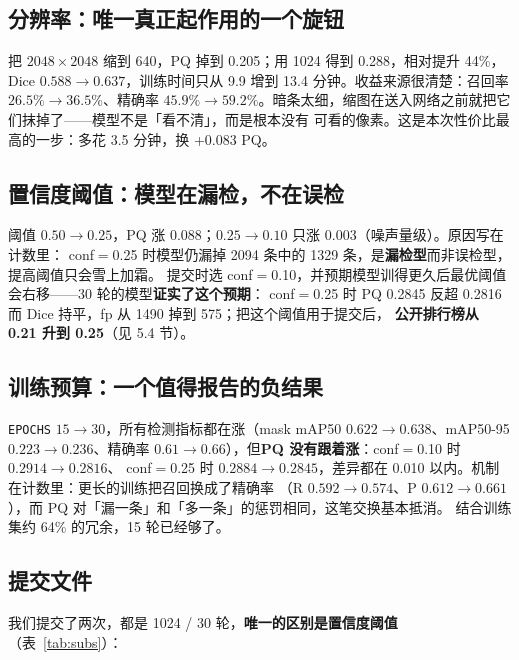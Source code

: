 \documentclass{article}
\begin{document}
\subsection{分辨率：唯一真正起作用的一个旋钮}
把 $2048\times2048$ 缩到 640，PQ 掉到 0.205；用 1024 得到 0.288，相对提升 44\%，Dice
$0.588\to0.637$，训练时间只从 9.9 增到 13.4 分钟。收益来源很清楚：召回率 $26.5\%\to36.5\%$、精确率
$45.9\%\to59.2\%$。暗条太细，缩图在送入网络之前就把它们抹掉了——模型不是「看不清」，而是根本没有
可看的像素。这是本次性价比最高的一步：多花 3.5 分钟，换 +0.083 PQ。

\subsection{置信度阈值：模型在漏检，不在误检}
阈值 $0.50\to0.25$，PQ 涨 0.088；$0.25\to0.10$ 只涨 0.003（噪声量级）。原因写在计数里：
conf$=$0.25 时模型仍漏掉 2094 条中的 1329 条，是\textbf{漏检型}而非误检型，提高阈值只会雪上加霜。
提交时选 conf$=$0.10，并预期模型训得更久后最优阈值会右移——30 轮的模型\textbf{证实了这个预期}：
conf$=$0.25 时 PQ 0.2845 反超 0.2816 而 Dice 持平，fp 从 1490 掉到 575；把这个阈值用于提交后，
\textbf{公开排行榜从 0.21 升到 0.25}（见 5.4 节）。

\subsection{训练预算：一个值得报告的负结果}
\texttt{EPOCHS} $15\to30$，所有检测指标都在涨（mask mAP50 $0.622\to0.638$、mAP50-95
$0.223\to0.236$、精确率 $0.61\to0.66$），但\textbf{PQ 没有跟着涨}：conf$=$0.10 时 $0.2914\to0.2816$、
conf$=$0.25 时 $0.2884\to0.2845$，差异都在 0.010 以内。机制在计数里：更长的训练把召回换成了精确率
（R $0.592\to0.574$、P $0.612\to0.661$），而 PQ 对「漏一条」和「多一条」的惩罚相同，这笔交换基本抵消。
结合训练集约 64\% 的冗余，15 轮已经够了。

\subsection{提交文件}
我们提交了两次，都是 1024 / 30 轮，\textbf{唯一的区别是置信度阈值}（表~\ref{tab:subs}）：
\end{document}
